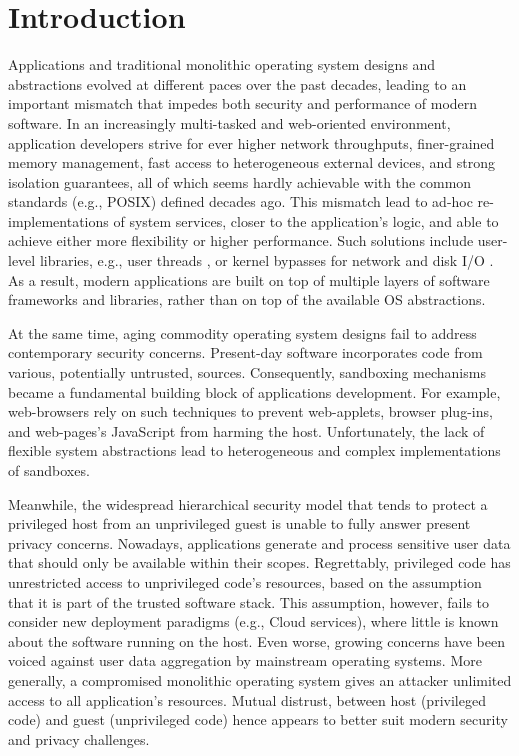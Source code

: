 \section{Introduction}

Applications and traditional monolithic operating system designs and abstractions evolved at different paces over the past decades, leading to an important mismatch that impedes both security and performance of modern software.
In an increasingly multi-tasked and web-oriented environment, application developers strive for ever higher network throughputs, finer-grained memory management, fast access to heterogeneous external devices, and strong isolation guarantees, all of which seems hardly achievable with the common standards (e.g., POSIX) defined decades ago.
This mismatch lead to ad-hoc re-implementations of system services, closer to the application's logic, and able to achieve either more flexibility or higher performance.
Such solutions include user-level libraries, e.g., user threads \cite{golang}, or kernel bypasses for network and disk I/O \cite{DBLP:conf/nsdi/NanavatiWW17,intel2014data,intel2016storage,BelayPKGKB14}.
As a result, modern applications are built on top of multiple layers of software frameworks and libraries, rather than on top of the available OS abstractions.

At the same time, aging commodity operating system designs fail to address contemporary security concerns.
Present-day software incorporates code from various, potentially untrusted, sources.
Consequently, sandboxing mechanisms became a fundamental building block of applications development.
For example, web-browsers rely on such techniques to prevent web-applets, browser plug-ins, and web-pages's JavaScript from harming the host.
Unfortunately, the lack of flexible system abstractions lead to heterogeneous and complex implementations of sandboxes.

Meanwhile, the widespread hierarchical security model that tends to protect a privileged host from an unprivileged guest is unable to fully answer present privacy concerns.
Nowadays, applications generate and process sensitive user data that should only be available within their scopes.
Regrettably, privileged code has unrestricted access to unprivileged code's resources, based on the assumption that it is part of the trusted software stack.
This assumption, however, fails to consider new deployment paradigms (e.g., Cloud services), where little is known about the software running on the host.
Even worse, growing concerns have been voiced against user data aggregation by mainstream operating systems\cite{microsoftspy}.
More generally, a compromised monolithic operating system gives an attacker unlimited access to all application's resources.
Mutual distrust, between host (privileged code) and guest (unprivileged code) hence appears to better suit modern security and privacy challenges.


